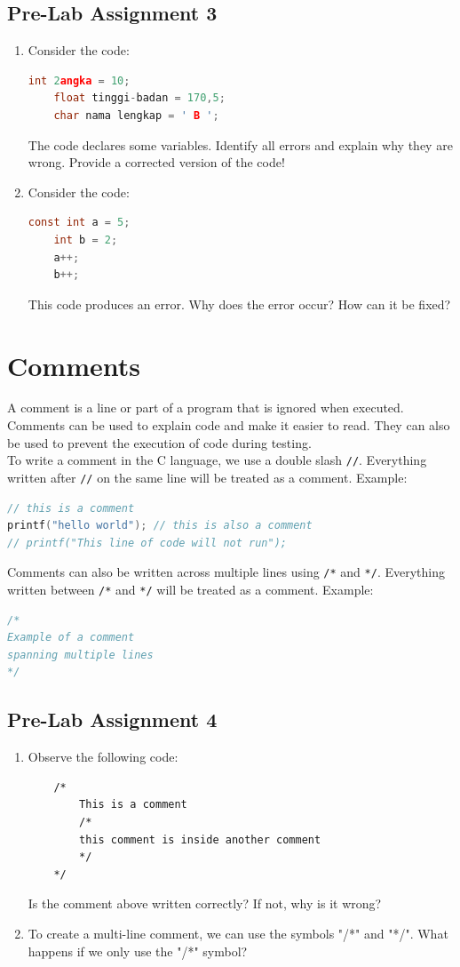 \subsection*{Pre-Lab Assignment 3}
\begin{enumerate}
	\item Consider the code:
	\begin{lstlisting}[language=c]
	int 2angka = 10;
	float tinggi-badan = 170,5;
	char nama lengkap = ' B ';
\end{lstlisting}
	The code declares some variables. Identify all errors and explain why they are wrong.  
	Provide a corrected version of the code!
	\item Consider the code:
	\begin{lstlisting}[language=c]
	const int a = 5;
	int b = 2;
	a++;
	b++;
\end{lstlisting}
	This code produces an error. Why does the error occur? How can it be fixed?
\end{enumerate}

\section{Comments}
A comment is a line or part of a program that is ignored when executed.  
Comments can be used to explain code and make it easier to read.  
They can also be used to prevent the execution of code during testing.  
\\ To write a comment in the C language, we use a double slash \verb|//|. Everything written after \verb|//| on the same line will be treated as a comment.  
Example:
\begin{lstlisting}[language=c]
// this is a comment
printf("hello world"); // this is also a comment
// printf("This line of code will not run");
\end{lstlisting}

Comments can also be written across multiple lines using \verb|/*| and \verb|*/|.  
Everything written between \verb|/*| and \verb|*/| will be treated as a comment.  
Example:
\begin{lstlisting}[language=c]
/*
Example of a comment
spanning multiple lines
*/
\end{lstlisting}

\subsection*{Pre-Lab Assignment 4}
\begin{enumerate}
    \item Observe the following code:
    \begin{lstlisting}
    /*
        This is a comment
        /*
        this comment is inside another comment
        */
    */
\end{lstlisting}
    Is the comment above written correctly? If not, why is it wrong?
    
    \item To create a multi-line comment, we can use the symbols "/*" and "*/".
    What happens if we only use the "/*" symbol?
\end{enumerate}

